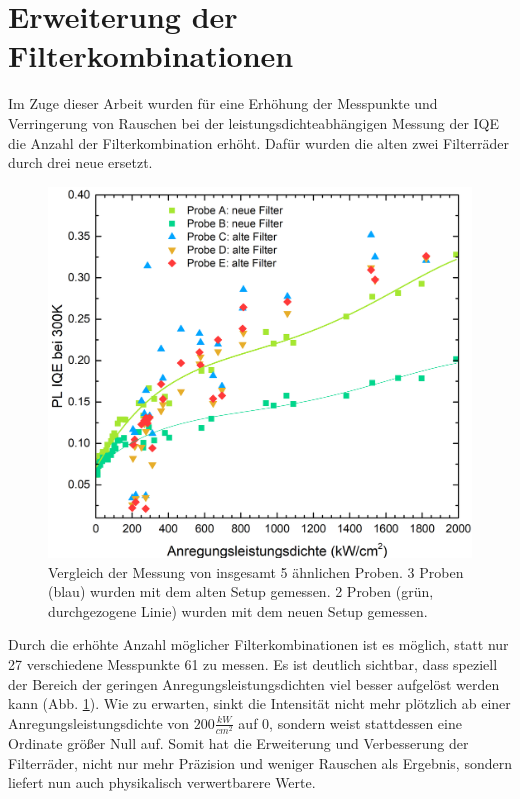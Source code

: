 \section{Erweiterung der Filterkombinationen}
\thispagestyle{fancy}

Im Zuge dieser Arbeit wurden für eine Erhöhung der Messpunkte und Verringerung von Rauschen bei der leistungsdichteabhängigen Messung der IQE die Anzahl der Filterkombination erhöht. Dafür wurden die alten zwei Filterräder durch drei neue ersetzt. 
%
\begin{figure}[H]
    \centering
    \begin{minipage}[t]{1\linewidth}
        \centering
        \includegraphics[width = 0.49\linewidth]{Bilder/AuswertungNovemeberKorr1VergleichFilter.png}
        \caption{Vergleich der Messung von insgesamt 5 ähnlichen Proben. 3 Proben (blau) wurden mit dem alten Setup gemessen. 2 Proben (grün, durchgezogene Linie) wurden mit dem neuen Setup gemessen. %
        }
        \label{fig:vergleichFilter}
    \end{minipage}
\end{figure}
\noindent
Durch die erhöhte Anzahl möglicher Filterkombinationen ist es möglich, statt nur 27 verschiedene Messpunkte 61 zu messen. Es ist deutlich sichtbar, dass speziell der Bereich der geringen Anregungsleistungsdichten viel besser aufgelöst werden kann (Abb. \ref{fig:vergleichFilter}). Wie zu erwarten, sinkt die Intensität nicht mehr plötzlich ab einer Anregungsleistungsdichte von $200 \frac{kW}{cm^2}$ auf 0, sondern weist stattdessen eine Ordinate größer Null auf. Somit hat die Erweiterung und Verbesserung der Filterräder, nicht nur mehr Präzision und weniger Rauschen als Ergebnis, sondern liefert nun auch physikalisch verwertbarere Werte.
